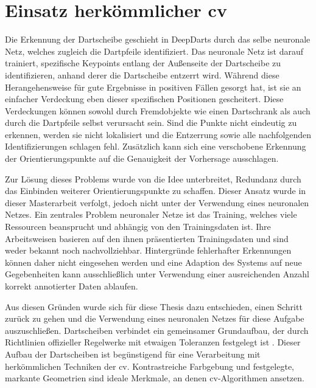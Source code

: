 


\section{Einsatz herkömmlicher \acl{cv}}
\label{sec:einsatz_cv}

Die Erkennung der Dartscheibe geschieht in DeepDarts durch das selbe neuronale Netz, welches zugleich die Dartpfeile identifiziert. Das neuronale Netz ist darauf trainiert, spezifische Keypoints entlang der Außenseite der Dartscheibe zu identifizieren, anhand derer die Dartscheibe entzerrt wird. Während diese Herangehensweise für gute Ergebnisse in positiven Fällen gesorgt hat, ist sie an einfacher Verdeckung eben dieser spezifischen Positionen gescheitert. Diese Verdeckungen können sowohl durch Fremdobjekte wie einen Dartschrank als auch durch die Dartpfeile selbst verursacht sein. Sind die Punkte nicht eindeutig zu erkennen, werden sie nicht lokalisiert und die Entzerrung sowie alle nachfolgenden Identifizierungen schlagen fehl. Zusätzlich kann sich eine verschobene Erkennung der Orientierungspunkte auf die Genauigkeit der Vorhersage ausschlagen.

Zur Lösung dieses Problems wurde von \citeauthor{deepdarts} die Idee unterbreitet, Redundanz durch das Einbinden weiterer Orientierungspunkte zu schaffen. Dieser Ansatz wurde in dieser Masterarbeit verfolgt, jedoch nicht unter der Verwendung eines neuronalen Netzes. Ein zentrales Problem neuronaler Netze ist das Training, welches viele Ressourcen beansprucht und abhängig von den Trainingsdaten ist. Ihre Arbeitsweisen basieren auf den ihnen präsentierten Trainingsdaten und sind weder bekannt noch nachvollziehbar. Hintergründe fehlerhafter Erkennungen können daher nicht eingesehen werden und eine Adaption des Systems auf neue Gegebenheiten kann ausschließlich unter Verwendung einer ausreichenden Anzahl korrekt annotierter Daten ablaufen.

Aus diesen Gründen wurde sich für diese Thesis dazu entschieden, einen Schritt zurück zu gehen und die Verwendung eines neuronalen Netzes für diese Aufgabe auszuschließen. Dartscheiben verbindet ein gemeinsamer Grundaufbau, der durch Richtlinien offizieller Regelwerke mit etwaigen Toleranzen festgelegt ist \cite{wdf-rules,pdc_rules}. Dieser Aufbau der Dartscheiben ist begünstigend für eine Verarbeitung mit herkömmlichen Techniken der \ac{cv}. Kontrastreiche Farbgebung und festgelegte, markante Geometrien sind ideale Merkmale, an denen \ac{cv}-Algorithmen ansetzen.

